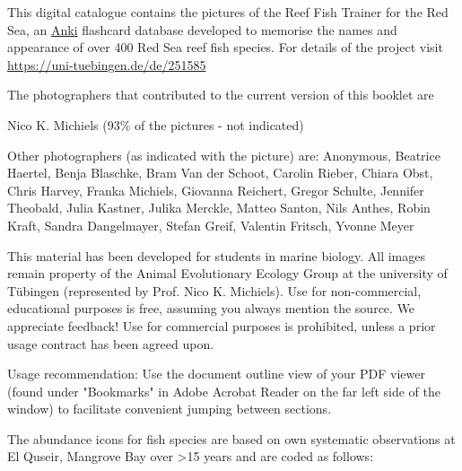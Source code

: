 \documentclass[a4paper]{article}
\begin{document}
\begin{raggedright}

    \bigskip

    This digital catalogue contains the pictures of the Reef Fish Trainer for the Red Sea, an \href{https://apps.ankiweb.net/}{Anki} flashcard database developed to memorise the names and appearance of over 400 Red Sea reef fish species. For details of the project visit \url{https://uni-tuebingen.de/de/251585}

    \bigskip

    The photographers that contributed to the current version of this booklet are

    \smallskip

    Nico K. Michiels (93\% of the pictures - not indicated)

    \smallskip

    Other photographers (as indicated with the picture) are:
    Anonymous, Beatrice Haertel, Benja Blaschke, Bram Van der Schoot, Carolin Rieber, Chiara Obst, Chris Harvey, Franka Michiels, Giovanna Reichert, Gregor Schulte, Jennifer Theobald, Julia Kastner, Julika Merckle, Matteo Santon, Nils Anthes, Robin Kraft, Sandra Dangelmayer, Stefan Greif, Valentin Fritsch, Yvonne Meyer

    \bigskip

    This material has been developed for students in marine biology. All images remain property of the Animal Evolutionary Ecology Group at the university of Tübingen (represented by Prof. Nico K. Michiels). Use for non-commercial, educational purposes is free, assuming you always mention the source. We appreciate feedback! Use for commercial purposes is prohibited, unless a prior usage contract has been agreed upon.

    \bigskip

    Usage recommendation: Use the document outline view of your PDF viewer (found under "Bookmarks" in Adobe Acrobat Reader on the far left side of the window) to facilitate convenient jumping between sections.

    \bigskip

    The abundance icons for fish species are based on own systematic observations at El Quseir, Mangrove Bay over >15 years and are coded as follows:

\end{raggedright}
\end{document}
